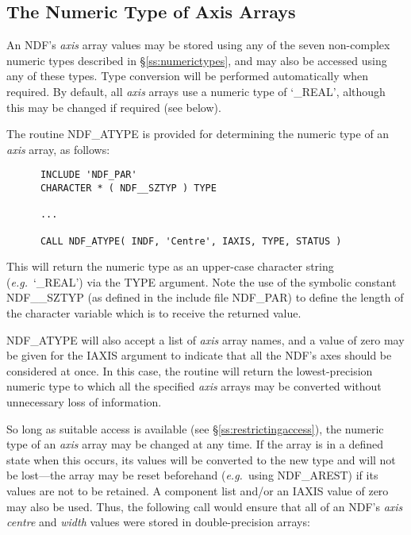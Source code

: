 \documentclass[twoside,11pt]{article}
\newcommand{\htmlref}[2]{#1}
\newcommand{\xlabel}[1]{}
\newcommand{\st}[1]{{\em{#1}}}
\begin{document}
\subsection{\xlabel{the_numeric_type_of_axis_arrays}The Numeric Type of Axis Arrays}

An NDF's \st{axis\/} array values may be stored using any of the seven
non-complex numeric types described in \S\ref{ss:numerictypes}, and may also
be accessed using any of these types. 
Type conversion will be performed automatically when required. 
By default, all \st{axis\/} arrays use a numeric type of `\_REAL', although
this may be changed if required (see below). 

The routine \htmlref{NDF\_ATYPE}{NDF_ATYPE} is provided for determining the numeric type of an
\st{axis\/} array, as follows: 

\small
\begin{verbatim}
      INCLUDE 'NDF_PAR'
      CHARACTER * ( NDF__SZTYP ) TYPE

      ...

      CALL NDF_ATYPE( INDF, 'Centre', IAXIS, TYPE, STATUS )
\end{verbatim}
\normalsize

This will return the numeric type as an upper-case character string
(\st{e.g.}\ `\_REAL') via the TYPE argument.  
Note the use of the symbolic constant NDF\_\_SZTYP (as defined in the 
include file NDF\_PAR) to define the length of the character variable which 
is to receive the returned value.

NDF\_ATYPE will also accept a list of \st{axis\/} array names, and a value
of zero may be given for the IAXIS argument to indicate that all the NDF's
axes should be considered at once. 
In this case, the routine will return the lowest-precision numeric type to
which all the specified \st{axis\/} arrays may be converted without
unnecessary loss of information. 

So long as suitable access is available (see \S\ref{ss:restrictingaccess}),
the numeric type of an \st{axis\/} array may be changed at any time. 
If the array is in a defined state when this occurs, its values will be
converted to the new type and will not be lost---the array may be reset
beforehand (\st{e.g.}\ using \htmlref{NDF\_AREST}{NDF_AREST}) if its values are not to be
retained. 
A component list and/or an IAXIS value of zero may also be used.
Thus, the following call would ensure that all of an NDF's \st{axis
centre\/} and \st{width\/} values were stored in double-precision
arrays: 
\end{document}
